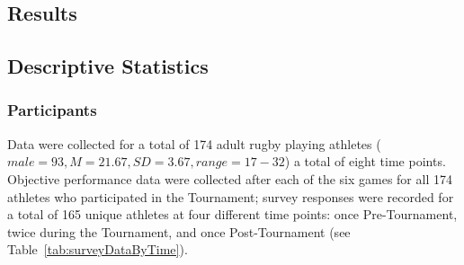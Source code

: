 \begin{CJK}{UTF8}{gbsn}































\clearpage

\section{Results}


\subsection{Descriptive Statistics}

  \subsubsection{Participants}

Data were collected for a total of 174 adult rugby playing athletes ($male = 93, M = 21.67, SD = 3.67, range = 17-32$) a total of eight time points. Objective performance data were collected after each of the six games for all 174 athletes who participated in the Tournament; survey responses were recorded for a total of 165 unique athletes at four different time points: once Pre-Tournament, twice during the Tournament, and once Post-Tournament (see Table~\ref{tab:surveyDataByTime}).






\end{CJK}
